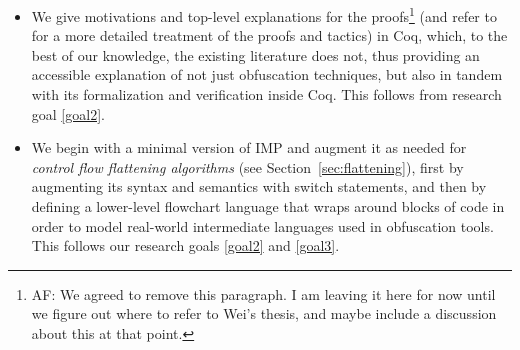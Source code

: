 \documentclass[compsoc,conference,a4paper,10pt,times]{IEEEtran}
\begin{document}
\begin{itemize}
    
    \item We give motivations and top-level explanations for the proofs\footnote{AF: We agreed to remove this paragraph.  I am leaving it here for now until we figure out where to refer to Wei's thesis, and maybe include a discussion about this at that point.} (and refer to \cite{Weyun} for a more detailed treatment of the proofs and tactics) in Coq, which, to the best of our knowledge, the existing literature does not, thus providing an accessible explanation of not just obfuscation techniques, but also in tandem with its formalization and verification inside Coq. This follows from research goal \ref{goal2}.\label{itm:2}
   \item We begin with a minimal version of IMP and augment it as needed for \emph{control flow flattening algorithms} (see Section~\ref{sec:flattening}),
   first by augmenting its syntax and semantics with switch statements, and then by defining a lower-level flowchart language that wraps around blocks of code in order to model real-world intermediate languages used in obfuscation tools. This follows our research goals \ref{goal2} and \ref{goal3}. \label{itm:3}
\end{itemize}



\end{document}
